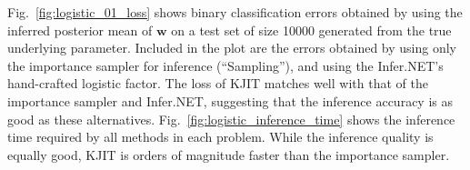 \documentclass[english]{article}
\theoremstyle{plain}
\theoremstyle{plain}
\newcommand{\aenote}[1]{}
\newcommand{\figref}[1]{Fig.~\ref{#1}}
\begin{document}
\figref{fig:logistic_01_loss} shows binary classification errors obtained by 
using the inferred posterior mean of $\boldsymbol{w}$ on a test set of size 
10000 generated from the true underlying parameter. 
Included in the plot are the errors obtained by using only the importance 
sampler for inference (``Sampling''), and using the Infer.NET's 
hand-crafted logistic factor. The loss of KJIT matches well with that of 
the importance sampler and Infer.NET, suggesting that the inference accuracy
is as good as these alternatives. \figref{fig:logistic_inference_time} 
shows the inference time required by all methods in each problem. 
While the inference quality is equally good, KJIT is orders of magnitude faster 
than the importance sampler. 

% 
\end{document}
